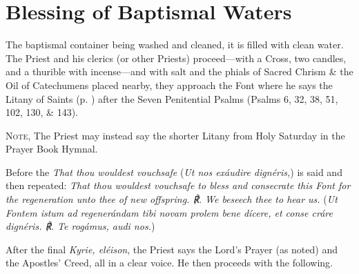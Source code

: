 \section{Blessing of Baptismal Waters}\label{BaptismalBlessing}
\fancyhead[RE,LO]{}
\begin{secrubric}
    The baptismal container being washed and cleaned, it is filled with clean water. The Priest and his clerics (or other Priests) proceed---with a Cross, two candles, and a thurible with incense---and with salt and the phials of Sacred Chrism \& the Oil of Catechumens placed nearby, they approach the Font where he says the Litany of Saints (p. \pageref{LitanySaints}) after the Seven Penitential Psalms (Psalms 6, 32, 38, 51, 102, 130, \& 143).\par
    \textsc{Note,} The Priest may instead say the shorter Litany from Holy Saturday in the Prayer Book Hymnal.
\end{secrubric}
\begin{secrubric}
    Before the \emph{That thou wouldest vouchsafe} (\emph{Ut nos exáudire dignéris,}) is said and then repeated: \emph{That thou wouldest vouchsafe to {} bless and {} consecrate this Font for the regeneration unto thee of new offspring. ℟. We beseech thee to hear us.} (\emph{Ut Fontem istum ad regenerándam tibi novam prolem bene {} dícere, et conse {} cráre dignéris. ℟. Te rogámus, audi nos.})
\end{secrubric}
\begin{secrubric}
    After the final \emph{Kyrie, eléison}, the Priest says the Lord's Prayer (as noted) and the Apostles' Creed, all in a clear voice. He then proceeds with the following.
\end{secrubric}






\oremus

